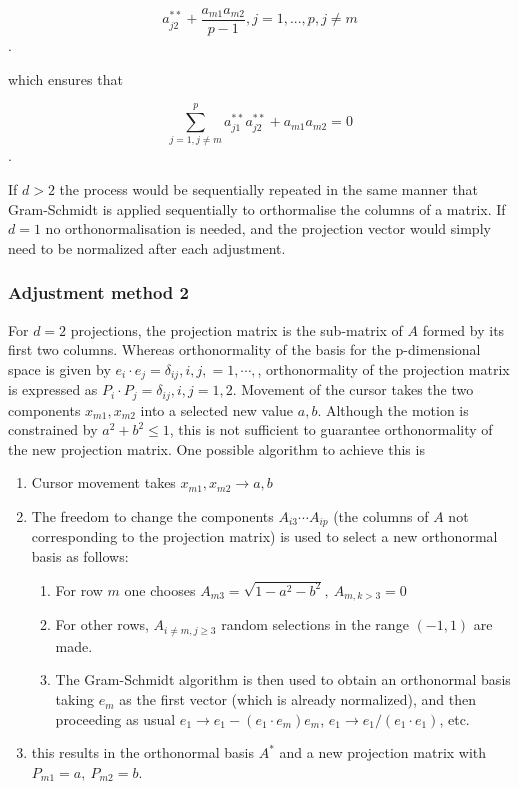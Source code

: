 \documentclass[]{interact}
\theoremstyle{plain}%
\theoremstyle{definition}
\theoremstyle{remark}
\begin{document}
\[a^{**}_{j2}+\frac{a_{m1}a_{m2}}{p-1}, j=1, ..., p, j\neq m\].

which ensures that

\[\sum_{j=1, j\neq m}^p a^{**}_{j1}a^{**}_{j2} + a_{m1}a_{m2} = 0\].

If \(d>2\) the process would be sequentially repeated in the same manner
that Gram-Schmidt is applied sequentially to orthormalise the columns of
a matrix. If \(d=1\) no orthonormalisation is needed, and the projection
vector would simply need to be normalized after each adjustment.

\hypertarget{adjustment-method-2}{%
\subsubsection{Adjustment method 2}\label{adjustment-method-2}}

For \(d=2\) projections, the projection matrix is the sub-matrix of
\(A\) formed by its first two columns. Whereas orthonormality of the
basis for the p-dimensional space is given by
\(e_i\cdot e_j=\delta_{ij},{i,j,=1,\cdots,}\), orthonormality of the
projection matrix is expressed as
\(P_i\cdot P_j=\delta_{ij}, {i,j=1,2}\). Movement of the cursor takes
the two components \({x_{m1},x_{m2}}\) into a selected new value
\({a,b}\). Although the motion is constrained by \(a^2+b^2\leq 1\), this
is not sufficient to guarantee orthonormality of the new projection
matrix. One possible algorithm to achieve this is

\begin{enumerate}
\item Cursor movement takes ${x_{m1},x_{m2}}\to {a,b}$
\item The freedom to change the components $A_{i3}\cdots A_{ip}$ (the columns of $A$ not corresponding to the projection matrix) is used to select a new orthonormal basis as follows:
\begin{enumerate}
\item For row $m$ one chooses $A_{m3}=\sqrt{1-a^2-b^2},~A_{m,k>3}=0$
\item For other rows, $A_{i\neq m,j\geq3}$ random selections in the range $(-1,1)$ are made.
\item The Gram-Schmidt algorithm is then used to obtain an orthonormal basis taking $e_m$ as the first vector (which is already normalized), and then proceeding as usual $e_1\to e_1-(e_1\cdot e_m) e_m$, $e_1\to e_1/(e_1\cdot e_1)$, etc.
\end{enumerate}
\item this results in the orthonormal basis $A^*$ and a new projection matrix with $P_{m1}=a,~P_{m2}=b$.
\end{enumerate}
\end{document}

